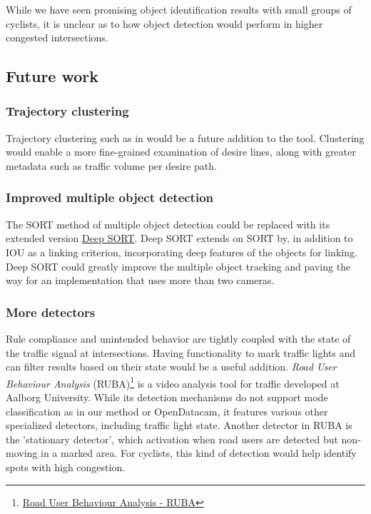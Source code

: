 While we have seen promising object identification results with small groups
of cyclists, it is unclear as to how object detection would perform in higher congested intersections. 
\ \\

\subsection{Future work}
\subsubsection{Trajectory clustering}
Trajectory clustering such as in \cite{gariel_trajectory_2011} would be a future addition to the tool.
Clustering would enable a more fine-grained examination of desire lines,
along with greater metadata such as traffic volume per desire path.

\subsubsection{Improved multiple object detection}
The SORT method of multiple object detection could be replaced with its extended version \href{https://github.com/nwojke/deep_sort}{Deep SORT}.
Deep SORT extends on SORT by, in addition to IOU as a linking criterion, incorporating
deep features of the objects for linking. Deep SORT could greatly improve the multiple object tracking
and paving the way for an implementation that uses more than two cameras.

\subsubsection{More detectors}
Rule compliance and unintended behavior are tightly coupled with the state of the traffic signal at intersections. 
Having functionality to mark traffic lights and can filter results based on their state would be a useful addition. 
\textit{Road User Behaviour Analysis} (RUBA)\footnote{\href{https://vbn.aau.dk/en/publications/the-ruba-watchdog-video-analysis-tool}{Road User Behaviour Analysis - RUBA}} 
is a video analysis tool for traffic developed at Aalborg University. While its detection mechanisms do not support mode classification
as in our method or OpenDatacam, it features various other specialized detectors, including traffic light state. 
Another detector in RUBA is the 'stationary detector', which activation when road users are detected but non-moving in a marked area. 
For cyclists, this kind of detection would help identify spots with high congestion.